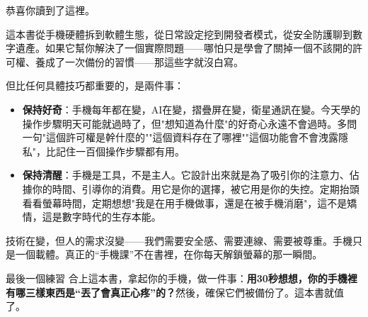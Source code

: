 
恭喜你讀到了這裡。

這本書從手機硬體拆到軟體生態，從日常設定挖到開發者模式，從安全防護聊到數字遺產。如果它幫你解決了一個實際問題——哪怕只是學會了關掉一個不該開的許可權、養成了一次備份的習慣——那這些字就沒白寫。

但比任何具體技巧都重要的，是兩件事：

\begin{itemize}
  \item \textbf{保持好奇}：手機每年都在變，AI在變，摺疊屏在變，衛星通訊在變。今天學的操作步驟明天可能就過時了，但"想知道為什麼"的好奇心永遠不會過時。多問一句"這個許可權是幹什麼的""這個資料存在了哪裡""這個功能會不會洩露隱私"，比記住一百個操作步驟都有用。
  \item \textbf{保持清醒}：手機是工具，不是主人。它設計出來就是為了吸引你的注意力、佔據你的時間、引導你的消費。用它是你的選擇，被它用是你的失控。定期抬頭看看螢幕時間，定期想想"我是在用手機做事，還是在被手機消磨"，這不是矯情，這是數字時代的生存本能。
\end{itemize}

技術在變，但人的需求沒變——我們需要安全感、需要連線、需要被尊重。手機只是一個載體。真正的“手機課”不在書裡，在你每天解鎖螢幕的那一瞬間。

\begin{tcbpractice}{最後一個練習}
合上這本書，拿起你的手機，做一件事：\textbf{用30秒想想，你的手機裡有哪三樣東西是“丟了會真正心疼”的？}然後，確保它們被備份了。這本書就值了。

\end{tcbpractice}
